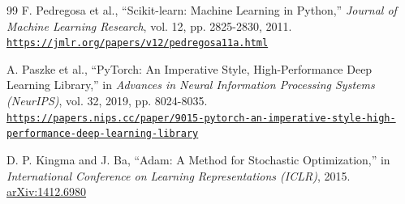 \documentclass{article}
\renewcommand{\url}[1]{\href{#1}{\nolinkurl{#1}}}
\begin{document}
\begin{thebibliography}{99}
F. Pedregosa et al.,
``Scikit-learn: Machine Learning in Python,''
\textit{Journal of Machine Learning Research}, vol. 12, pp. 2825-2830, 2011.\\
\url{https://jmlr.org/papers/v12/pedregosa11a.html}

A. Paszke et al.,
``PyTorch: An Imperative Style, High-Performance Deep Learning Library,''
in \textit{Advances in Neural Information Processing Systems (NeurIPS)}, vol. 32, 2019, pp. 8024-8035.\\
\url{https://papers.nips.cc/paper/9015-pytorch-an-imperative-style-high-performance-deep-learning-library}

D. P. Kingma and J. Ba,
``Adam: A Method for Stochastic Optimization,''
in \textit{International Conference on Learning Representations (ICLR)}, 2015.\\
\href{https://arxiv.org/abs/1412.6980}{arXiv:1412.6980}

\end{thebibliography}
\end{document}
